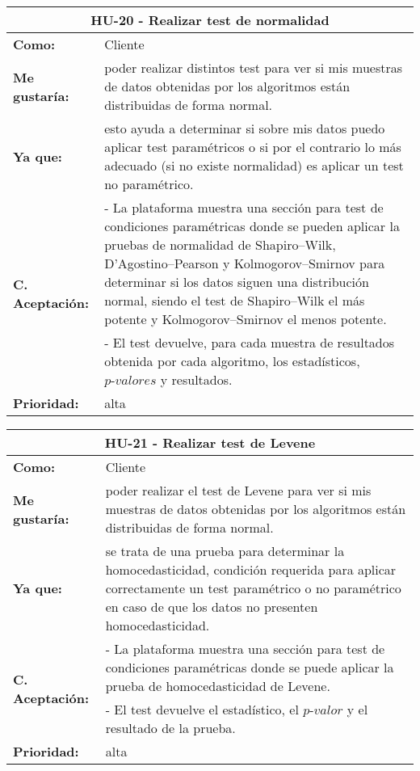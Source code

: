 \begin{table}[H]
	\begin{tabular}{| p{3cm}| p{11cm} |}
		\hline
		\multicolumn{2}{|c|}{\textbf{HU-20} - Realizar test de normalidad} \\ \hline
		\textbf{Como:} & Cliente \\ \hline
		\textbf{Me gustaría:} & poder realizar distintos test para ver si mis muestras de datos obtenidas por los algoritmos están distribuidas de forma normal. \\ \hline
		\textbf{Ya que:} & esto ayuda a determinar si sobre mis datos puedo aplicar test paramétricos o si por el contrario lo más adecuado (si no existe normalidad) es aplicar un test no paramétrico. \\ \hline
		\multirow{2}{11cm}{\textbf{C. Aceptación:}} & - La plataforma muestra una sección para test de condiciones paramétricas donde se pueden aplicar la pruebas de normalidad de Shapiro–Wilk, D’Agostino–Pearson y Kolmogorov–Smirnov para determinar si los datos siguen una distribución normal, siendo el test de Shapiro–Wilk el más potente y Kolmogorov–Smirnov el menos potente. \\
		& - El test devuelve, para cada muestra de resultados obtenida por cada algoritmo, los estadísticos, $\textit{p-valores}$ y resultados. \\ \hline
		\textbf{\textbf{Prioridad:}} & alta \\ \hline
	\end{tabular}
\end{table}


\begin{table}[H]
	\begin{tabular}{| p{3cm}| p{11cm} |}
		\hline
		\multicolumn{2}{|c|}{\textbf{HU-21} - Realizar test de Levene} \\ \hline
		\textbf{Como:} & Cliente \\ \hline
		\textbf{Me gustaría:} & poder realizar el test de Levene para ver si mis muestras de datos obtenidas por
		los algoritmos están distribuidas de forma normal.  \\ \hline
		\textbf{Ya que:} & se trata de una prueba para determinar la homocedasticidad, condición requerida para aplicar correctamente un test paramétrico o no paramétrico en caso de que los datos no presenten homocedasticidad. \\ \hline
		\multirow{2}{11cm}{\textbf{C. Aceptación:}} & - La plataforma muestra una sección para test de condiciones paramétricas donde se puede aplicar la prueba de homocedasticidad de Levene. \\
		& - El test devuelve el estadístico, el $\textit{p-valor}$ y el resultado de la prueba. \\ \hline
		\textbf{\textbf{Prioridad:}} & alta \\ \hline
	\end{tabular}
\end{table}

